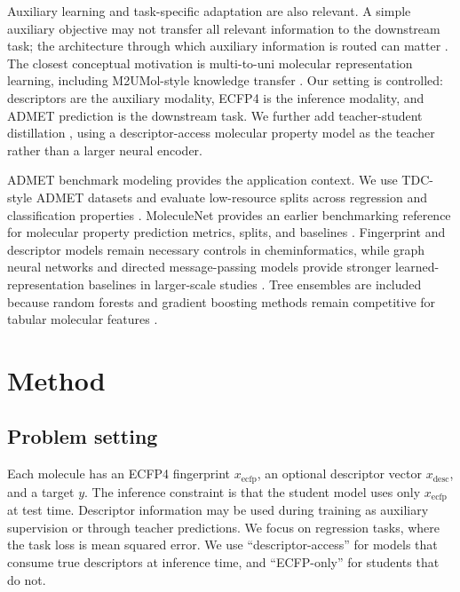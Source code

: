 \documentclass[11pt]{article}
\begin{document}
Auxiliary learning and task-specific adaptation are also relevant. A simple
auxiliary objective may not transfer all relevant information to the downstream
task; the architecture through which auxiliary information is routed can matter
\citep{Ruder2017,Dey2024AuxAdapt}. The closest conceptual motivation is
multi-to-uni molecular representation learning, including M2UMol-style
knowledge transfer \citep{Xiong2026M2UMol}. Our setting is controlled:
descriptors are the auxiliary modality, ECFP4 is the inference modality, and
ADMET prediction is the downstream task. We further add teacher-student
distillation \citep{Hinton2015}, using a descriptor-access molecular property
model as the teacher rather than a larger neural encoder.

ADMET benchmark modeling provides the application context. We use TDC-style
ADMET datasets and evaluate low-resource splits across regression and
classification properties \citep{Huang2021TDC}. MoleculeNet provides an earlier
benchmarking reference for molecular property prediction metrics, splits, and
baselines \citep{Wu2018MoleculeNet}. Fingerprint and descriptor models remain
necessary controls in cheminformatics, while graph neural networks and directed
message-passing models provide stronger learned-representation baselines in
larger-scale studies
\citep{Kearnes2016GraphConv,Yang2019DMPNN,Xiong2020AttentiveFP,Heid2024Chemprop}.
Tree ensembles are included because random forests and gradient boosting
methods remain competitive for tabular molecular features
\citep{Breiman2001,Chen2016XGBoost,Ke2017LightGBM,Tian2022ADMETBoost}.

\section{Method}

\subsection{Problem setting}

Each molecule has an ECFP4 fingerprint $x_{\mathrm{ecfp}}$, an optional
descriptor vector $x_{\mathrm{desc}}$, and a target $y$. The inference
constraint is that the student model uses only $x_{\mathrm{ecfp}}$ at test
time. Descriptor information may be used during training as auxiliary
supervision or through teacher predictions. We focus on regression tasks, where
the task loss is mean squared error. We use ``descriptor-access'' for models
that consume true descriptors at inference time, and ``ECFP-only'' for
students that do not.
\end{document}
